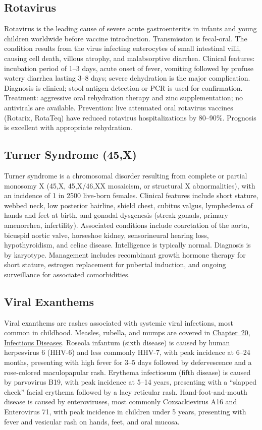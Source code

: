 \subsection{Rotavirus}
\label{sec:Rotavirus}
Rotavirus is the leading cause of severe acute gastroenteritis in infants and young children worldwide before vaccine introduction. Transmission is fecal-oral. The condition results from the virus infecting enterocytes of small intestinal villi, causing cell death, villous atrophy, and malabsorptive diarrhea. Clinical features: incubation period of 1--3 days, acute onset of fever, vomiting followed by profuse watery diarrhea lasting 3--8 days; severe dehydration is the major complication. Diagnosis is clinical; stool antigen detection or PCR is used for confirmation. Treatment: aggressive oral rehydration therapy and zinc supplementation; no antivirals are available. Prevention: live attenuated oral rotavirus vaccines (Rotarix, RotaTeq) have reduced rotavirus hospitalizations by 80--90\%. Prognosis is excellent with appropriate rehydration.

\subsection{Turner Syndrome (45,X)}
\label{sec:Turner Syndrome}
Turner syndrome is a chromosomal disorder resulting from complete or partial monosomy X (45,X, 45,X/46,XX mosaicism, or structural X abnormalities), with an incidence of 1 in 2500 live-born females. Clinical features include short stature, webbed neck, low posterior hairline, shield chest, cubitus valgus, lymphedema of hands and feet at birth, and gonadal dysgenesis (streak gonads, primary amenorrhea, infertility). Associated conditions include coarctation of the aorta, bicuspid aortic valve, horseshoe kidney, sensorineural hearing loss, hypothyroidism, and celiac disease. Intelligence is typically normal. Diagnosis is by karyotype. Management includes recombinant growth hormone therapy for short stature, estrogen replacement for pubertal induction, and ongoing surveillance for associated comorbidities.

\subsection{Viral Exanthems}
\label{sec:Viral Exanthems}
Viral exanthems are rashes associated with systemic viral infections, most common in childhood. Measles, rubella, and mumps are covered in \hyperref[ch:infectious]{Chapter~20, Infectious Diseases}. Roseola infantum (sixth disease) is caused by human herpesvirus 6 (HHV-6) and less commonly HHV-7, with peak incidence at 6--24 months, presenting with high fever for 3--5 days followed by defervescence and a rose-colored maculopapular rash. Erythema infectiosum (fifth disease) is caused by parvovirus B19, with peak incidence at 5--14 years, presenting with a ``slapped cheek'' facial erythema followed by a lacy reticular rash. Hand-foot-and-mouth disease is caused by enteroviruses, most commonly Coxsackievirus A16 and Enterovirus 71, with peak incidence in children under 5 years, presenting with fever and vesicular rash on hands, feet, and oral mucosa.

